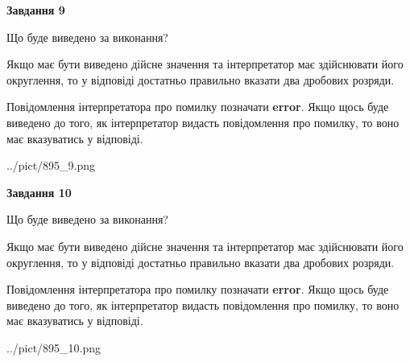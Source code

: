 \documentclass[12pt, ukrainian]{article}
\begin{document}
{\begin {Large}
{\begin {center}\textbf{Завдання 9}\end {center}}\par
Що буде виведено за виконання? \par

Якщо має бути виведено дійсне значення та інтерпретатор має здійснювати його округлення, 
то у відповіді достатньо правильно вказати два дробових розряди.

Повідомлення інтерпретатора про помилку позначати \textbf{error}.
Якщо щось буде виведено до того, як інтерпретатор видасть повідомлення про помилку, 
то воно має вказуватись у відповіді. \par

\begin{center}
	{../pict/895_9.png}
\end{center}
\newpage

{\begin {center}\textbf{Завдання 10}\end {center}}\par
Що буде виведено за виконання? \par

Якщо має бути виведено дійсне значення та інтерпретатор має здійснювати його округлення, 
то у відповіді достатньо правильно вказати два дробових розряди.

Повідомлення інтерпретатора про помилку позначати \textbf{error}.
Якщо щось буде виведено до того, як інтерпретатор видасть повідомлення про помилку, 
то воно має вказуватись у відповіді. \par

\begin{center}
	{../pict/895_10.png}
\end{center}
\newpage

\end {Large}}
\end{document}
